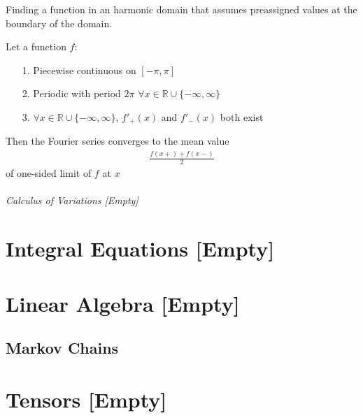 \documentclass[12pt, english]{book}
\begin{document}
	\begin{definition}
		\label{Dirichlet Problem Definition - Partial}
		Finding a function in an harmonic domain that assumes preassigned values at the boundary of the domain.
	\end{definition}
	
	\begin{theorem}
		\label{Fourier Theorem - PDE}
		Let a function \(f\):
		\begin{itemize}
			\item[1.] Piecewise continuous on \([-\pi,\pi]\)
			\item[2.] Periodic with period \(2\pi\) \(\forall x \in \mathbb{R} \cup \{-\infty,\infty\}\)
			\item[3.] \(\forall x \in \mathbb{R} \cup \{-\infty,\infty\}\), \(f'_{+}(x)\) and \(f'_{-}(x)\) both exist 
		\end{itemize}
		Then the Fourier series converges to the mean value
		\begin{align*}
			\frac{f(x+) + f(x-)}{2}
		\end{align*}
		of one-sided limit of \(f\) at \(x\)
	\end{theorem}
	
	\paragraph{Calculus of Variations [Empty]} \label{Calculus of Variations Part}
	
	\part{Integral Equations [Empty]} \label{Integral Equations Part}
	
	
	\part{Linear Algebra [Empty]} \label{Linear Algebra Part}
	
	\chapter{Markov Chains} \label{Markov Chains Chapter - Linear Algebra}
	
	
	\part{Tensors [Empty]} \label{Tensors Part}
	
\end{document}
